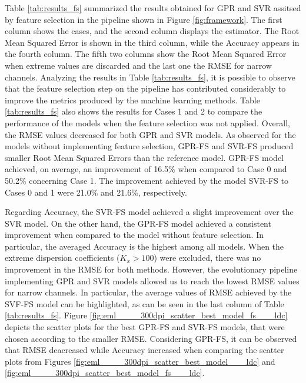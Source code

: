 \documentclass[a4paper,12pt, english]{article}
\begin{document}
Table \ref{tab:results_fs} summarized the results obtained for GPR and SVR assitsed by feature selection in the pipeline shown in Figure \ref{fig:framework}.
The first column shows the cases, and the second column displays the estimator. The Root Mean Squared Error is shown in the third column, while the Accuracy appears in the fourth column. The fifth two columns show the Root Mean Squared Error when extreme values are discarded and the last one the RMSE for narrow channels.
% 
Analyzing the results in Table  \ref{tab:results_fs}, it is possible to observe that the feature selection step on the pipeline has contributed considerably to improve the metrics produced by the machine learning methods. Table \ref{tab:results_fs} also shows the results for Cases 1 and 2 to compare the performance of the models when the feature selection was not applied.
% 
Overall, the RMSE values decreased for both GPR and SVR models. 
As observed for the models without implementing feature selection, GPR-FS and SVR-FS produced smaller Root Mean Squared Errors than the reference model.
GPR-FS model achieved, on average, an improvement of 16.5\% when compared to Case 0 and 50.2\% concerning Case 1. The improvement achieved by the model SVR-FS to Cases 0 and 1 were 21.0\% and 21.6\%, respectively.

Regarding Accuracy, the SVR-FS model achieved a slight improvement over the SVR model. On the other hand, the GPR-FS model achieved a consistent improvement when compared to the model without feature selection. In particular, the averaged Accuracy is the highest among all models.
% 
When the extreme dispersion coefficients ($ K_x> 100 $) were excluded, there was no improvement in the RMSE for both methods. However, the evolutionary pipeline implementing  GPR and SVR models allowed us to reach the lowest RMSE values for narrow channels. In particular, the average values of RMSE achieved by the SVF-FS model can be highlighted, as can be seen in the last column of Table  \ref{tab:results_fs}.
% 
Figure \ref{fig:eml____300dpi_scatter_best_model_fs___ldc} depicts the scatter plots for the best GPR-FS and SVR-FS models, that were chosen according to the smaller RMSE.
Considering GPR-FS, 
it can be observed that RMSE deacreased while Accuracy increased
when comparing the scatter plots from Figures
\ref{fig:eml____300dpi_scatter_best_model___ldc}
and 
\ref{fig:eml____300dpi_scatter_best_model_fs___ldc}.
\end{document}
